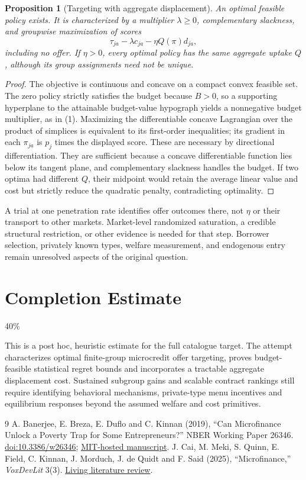 \documentclass[11pt,a4paper]{article}
\newtheorem{proposition}[theorem]{Proposition}
\theoremstyle{remark}
\begin{document}
\begin{proposition}[Targeting with aggregate displacement]
An optimal feasible policy exists. It is characterized by a multiplier $\lambda\ge0$, complementary slackness, and groupwise maximization of scores
\[
 \tau_{ja}-\lambda c_{ja}-\eta Q(\pi)d_{ja},
\]
including no offer. If $\eta>0$, every optimal policy has the same aggregate uptake $Q$, although its group assignments need not be unique.
\end{proposition}
\begin{proof}
The objective is continuous and concave on a compact convex feasible set. The zero policy strictly satisfies the budget because $B>0$, so a supporting hyperplane to the attainable budget-value hypograph yields a nonnegative budget multiplier, as in (1). Maximizing the differentiable concave Lagrangian over the product of simplices is equivalent to its first-order inequalities; its gradient in each $\pi_{ja}$ is $p_j$ times the displayed score. These are necessary by directional differentiation. They are sufficient because a concave differentiable function lies below its tangent plane, and complementary slackness handles the budget. If two optima had different $Q$, their midpoint would retain the average linear value and cost but strictly reduce the quadratic penalty, contradicting optimality.
\end{proof}
A trial at one penetration rate identifies offer outcomes there, not $\eta$ or their transport to other markets. Market-level randomized saturation, a credible structural restriction, or other evidence is needed for that step. Borrower selection, privately known types, welfare measurement, and endogenous entry remain unresolved aspects of the original question.

\section{Completion Estimate}
40\%

This is a post hoc, heuristic estimate for the full catalogue target.
The attempt characterizes optimal finite-group microcredit offer targeting, proves budget-feasible statistical regret bounds and incorporates a tractable aggregate displacement cost. Sustained subgroup gains and scalable contract rankings still require identifying behavioral mechanisms, private-type menu incentives and equilibrium responses beyond the assumed welfare and cost primitives.

\begin{thebibliography}{9}
 A. Banerjee, E. Breza, E. Duflo and C. Kinnan (2019), ``Can Microfinance Unlock a Poverty Trap for Some Entrepreneurs?'' NBER Working Paper 26346. \href{https://doi.org/10.3386/w26346}{doi:10.3386/w26346}; \href{https://economics.mit.edu/sites/default/files/publications/w26346.pdf}{MIT-hosted manuscript}.
 J. Cai, M. Meki, S. Quinn, E. Field, C. Kinnan, J. Morduch, J. de Quidt and F. Said (2025), ``Microfinance,'' \emph{VoxDevLit} 3(3). \href{https://voxdev.org/voxdevlit/microfinance}{Living literature review}.
\end{thebibliography}
\end{document}
